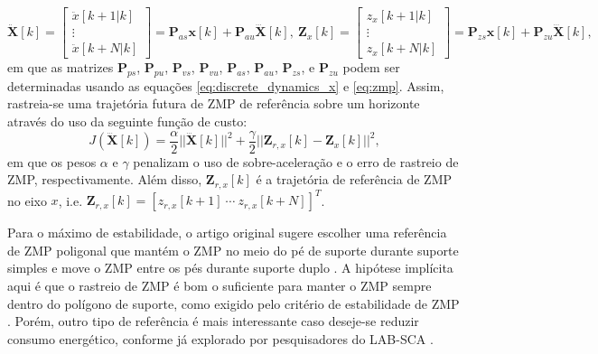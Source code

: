 \begin{equation}
\ddot{\mathrm{\mathbf{X}}}[k] = \begin{bmatrix}
\ddot{x}[k+1|k] \\
\vdots \\
\ddot{x}[k+N|k]
\end{bmatrix} = \mathrm{\mathbf{P}}_{as} \mathrm{\mathbf{x}}[k] + \mathrm{\mathbf{P}}_{au} \dddot{\mathrm{\mathbf{X}}}[k], \
\mathrm{\mathbf{Z}}_x[k] = \begin{bmatrix}
z_x[k+1|k] \\
\vdots \\
z_x[k+N|k]
\end{bmatrix} = 
\mathrm{\mathbf{P}}_{zs} \mathrm{\mathbf{x}}[k] + \mathrm{\mathbf{P}}_{zu} \dddot{\mathrm{\mathbf{X}}}[k],
\label{eq:zx_pred}
\end{equation}
em que as matrizes \( \mathrm{\mathbf{P}}_{ps} \), \( \mathrm{\mathbf{P}}_{pu} \), \( \mathrm{\mathbf{P}}_{vs} \), \( \mathrm{\mathbf{P}}_{vu} \), \( \mathrm{\mathbf{P}}_{as} \), \( \mathrm{\mathbf{P}}_{au} \), \( \mathrm{\mathbf{P}}_{zs} \), e \( \mathrm{\mathbf{P}}_{zu} \) podem ser determinadas usando as equações \eqref{eq:discrete_dynamics_x} e \eqref{eq:zmp}. Assim, rastreia-se uma trajetória futura de ZMP de referência sobre um horizonte através do uso da seguinte função de custo:
\begin{equation}
J \left( \dddot{\mathrm{\mathbf{X}}}[k] \right) = \frac{\alpha}{2} || \dddot{\mathrm{\mathbf{X}}}[k] ||^2 + \frac{\gamma}{2} || \mathrm{\mathbf{Z}}_{r,x}[k] - \mathrm{\mathbf{Z}}_x[k] ||^2,
\label{eq:optimization_preview}
\end{equation}
em que os pesos \( \alpha \) e \( \gamma \) penalizam o uso de sobre-aceleração e o erro de rastreio de ZMP, respectivamente. Além disso, \( \mathrm{\mathbf{Z}}_{r,x}[k] \) é a trajetória de referência de ZMP no eixo \( x \), i.e. \( \mathrm{\mathbf{Z}}_{r,x}[k] = \left[z_{r,x}[k+1] \ \cdots \ z_{r,x}[k+N] \right]^T \).

Para o máximo de estabilidade, o artigo original sugere escolher uma referência de ZMP poligonal que mantém o ZMP no meio do pé de suporte durante suporte simples e move o ZMP entre os pés durante suporte duplo \cite{kajita2003}. A hipótese implícita aqui é que o rastreio de ZMP é bom o suficiente para manter o ZMP sempre dentro do polígono de suporte, como exigido pelo critério de estabilidade de ZMP \cite{vukobratovic2004}. Porém, outro tipo de referência é mais interessante caso deseje-se reduzir consumo energético, conforme já explorado por pesquisadores do LAB-SCA \cite{max22}.

